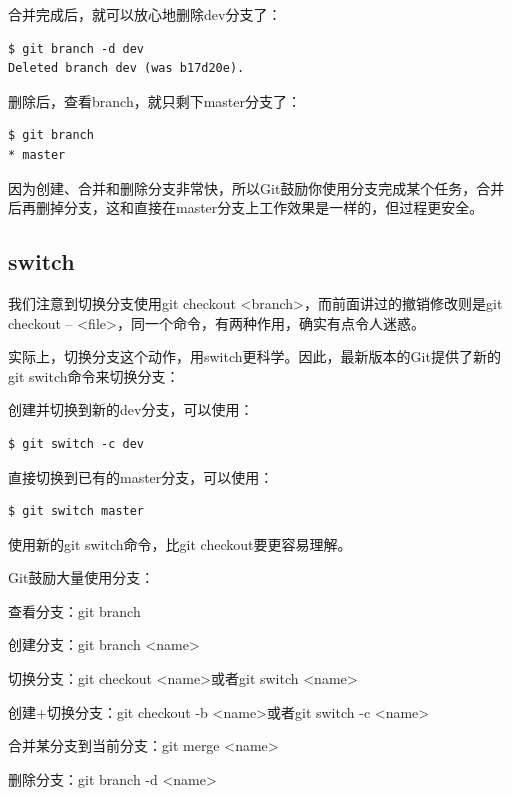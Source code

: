 合并完成后，就可以放心地删除dev分支了：

\begin{verbatim}
$ git branch -d dev
Deleted branch dev (was b17d20e).
\end{verbatim}

删除后，查看branch，就只剩下master分支了：

\begin{verbatim}
$ git branch
* master
\end{verbatim}

因为创建、合并和删除分支非常快，所以Git鼓励你使用分支完成某个任务，合并后再删掉分支，这和直接在master分支上工作效果是一样的，但过程更安全。

\subsection{switch}

我们注意到切换分支使用git checkout <branch>，而前面讲过的撤销修改则是git checkout -- <file>，同一个命令，有两种作用，确实有点令人迷惑。

实际上，切换分支这个动作，用switch更科学。因此，最新版本的Git提供了新的git switch命令来切换分支：

创建并切换到新的dev分支，可以使用：

\begin{verbatim}
$ git switch -c dev
\end{verbatim}

直接切换到已有的master分支，可以使用：

\begin{verbatim}
$ git switch master
\end{verbatim}

使用新的git switch命令，比git checkout要更容易理解。

\begin{tcolorbox}

Git鼓励大量使用分支：

查看分支：git branch

创建分支：git branch <name>

切换分支：git checkout <name>或者git switch <name>

创建+切换分支：git checkout -b <name>或者git switch -c <name>

合并某分支到当前分支：git merge <name>

删除分支：git branch -d <name>
\end{tcolorbox}

